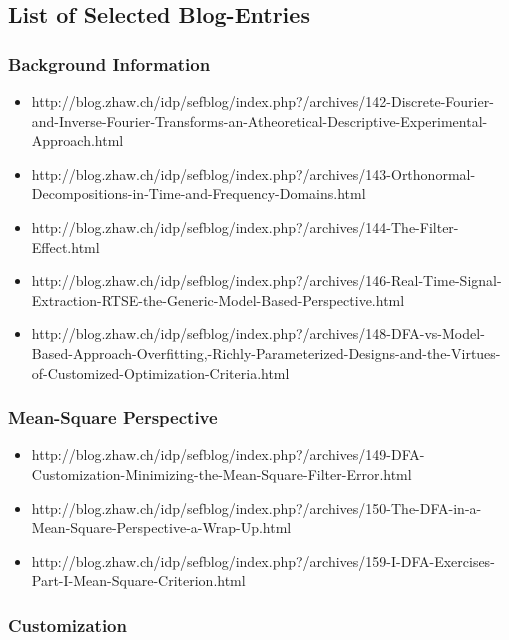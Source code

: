 \documentclass[11pt]{article}
\begin{document}
\subsection{List of Selected Blog-Entries}\label{sefblog}

\subsubsection{Background Information}


\begin{itemize}
\item http://blog.zhaw.ch/idp/sefblog/index.php?/archives/142-Discrete-Fourier-and-Inverse-Fourier-Transforms-an-Atheoretical-Descriptive-Experimental-Approach.html
\item http://blog.zhaw.ch/idp/sefblog/index.php?/archives/143-Orthonormal-Decompositions-in-Time-and-Frequency-Domains.html
\item http://blog.zhaw.ch/idp/sefblog/index.php?/archives/144-The-Filter-Effect.html
\item http://blog.zhaw.ch/idp/sefblog/index.php?/archives/146-Real-Time-Signal-Extraction-RTSE-the-Generic-Model-Based-Perspective.html
\item http://blog.zhaw.ch/idp/sefblog/index.php?/archives/148-DFA-vs-Model-Based-Approach-Overfitting,-Richly-Parameterized-Designs-and-the-Virtues-of-Customized-Optimization-Criteria.html

\end{itemize}

\subsubsection{Mean-Square Perspective}

\begin{itemize}
\item http://blog.zhaw.ch/idp/sefblog/index.php?/archives/149-DFA-Customization-Minimizing-the-Mean-Square-Filter-Error.html
\item http://blog.zhaw.ch/idp/sefblog/index.php?/archives/150-The-DFA-in-a-Mean-Square-Perspective-a-Wrap-Up.html
\item http://blog.zhaw.ch/idp/sefblog/index.php?/archives/159-I-DFA-Exercises-Part-I-Mean-Square-Criterion.html
\end{itemize}

\subsubsection{Customization}
\end{document}
